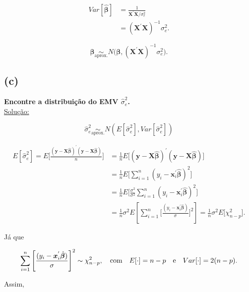 \documentclass[12pt, oldfontcommands]{article}\usepackage[]{graphicx}\usepackage[]{color}
\begin{document}
\begin{multicols}{2}
\begin{align*}
 Var[\hat{\bm{\beta}}] & =
 \frac{1}{\mathbf{X}^{'}\mathbf{X}/\sigma_{e}^{2}} \\ & =
 (\mathbf{X}^{'}\mathbf{X})^{-1}\sigma_{e}^{2}.
\end{align*}
\end{multicols}

\[ \boxed{\hat{\bm{\beta}} \underset{\text{aprox.}}{\sim}
          N\Big(\bm{\beta},
                (\mathbf{X}^{'}\mathbf{X})^{-1}\sigma_{e}^{2}\Big).} \]

\subsection*{(c)} 

\textbf{Encontre a distribuição do EMV \(\hat{\sigma}_{e}^{2}\).} \\

\underline{Solução:}

\[ \hat{\sigma}_{e}^{2} \underset{\text{aprox.}}{\sim}
    N(E[\hat{\sigma}_{e}^{2}], Var[\hat{\sigma}_{e}^{2}]) \]

\begin{align*}
 E[\hat{\sigma}_{e}^{2}] = E\bigg[\frac{
 (\mathbf{y} - \mathbf{X} \hat{\bm{\beta}})^{'}
 (\mathbf{y} - \mathbf{X} \hat{\bm{\beta}})}{n}\bigg] & = \frac{1}{n}
 E\Big[(\mathbf{y} - \mathbf{X} \hat{\bm{\beta}})^{'}
       (\mathbf{y} - \mathbf{X} \hat{\bm{\beta}})\Big] \\ & =
 \frac{1}{n} E\Bigg[\sum_{i = 1}^{n}
 (y_{i} - \bm{x}_{i}^{'}\hat{\bm{\beta}})^{2}\Bigg] \\ & = \frac{1}{n}
 E\Bigg[\frac{\sigma^{2}}{\sigma^{2}} \sum_{i = 1}^{n}
        (y_{i} - \bm{x}_{i}^{'}\hat{\bm{\beta}})^{2}\Bigg] \\ & =
 \frac{1}{n} \sigma^{2} E\left[\sum_{i = 1}^{n}
 \Bigg[\frac{(y_{i} - \bm{x}_{i}^{'}\hat{\bm{\beta}})}{\sigma}\Bigg]^{2}
 \right] = \frac{1}{n} \sigma^{2} E\Big[\chi_{n - p}^{2}\Big].
\end{align*}

Já que

\[ \sum_{i = 1}^{n} \Bigg[
   \frac{(y_{i} -\bm{x}_{i}^{'}\hat{\bm{\beta}})}{\sigma}\Bigg]^{2} \sim
   \chi_{n - p}^{2}, \quad {\rm com} \quad E[\cdot] = n - p \quad
   {\rm e} \quad Var[\cdot] = 2 (n - p).\]

Assim,
\end{document}
